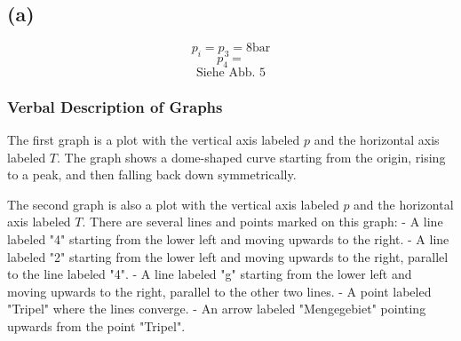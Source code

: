 

\subsection*{(a)}
\[
p_i = p_3 = 8 \text{bar}
\]
\[
p_4 = 
\]
\[
\text{Siehe Abb. 5}
\]

\subsubsection*{Verbal Description of Graphs}

The first graph is a plot with the vertical axis labeled \( p \) and the horizontal axis labeled \( T \). The graph shows a dome-shaped curve starting from the origin, rising to a peak, and then falling back down symmetrically.

The second graph is also a plot with the vertical axis labeled \( p \) and the horizontal axis labeled \( T \). There are several lines and points marked on this graph:
- A line labeled "4" starting from the lower left and moving upwards to the right.
- A line labeled "2" starting from the lower left and moving upwards to the right, parallel to the line labeled "4".
- A line labeled "g" starting from the lower left and moving upwards to the right, parallel to the other two lines.
- A point labeled "Tripel" where the lines converge.
- An arrow labeled "Mengegebiet" pointing upwards from the point "Tripel".